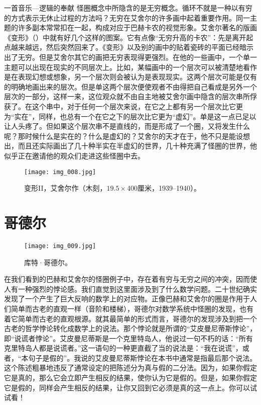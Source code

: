 \begin{intro}{一首音乐—逻辑的奉献}
怪圈概念中所隐含的是无穷概念。循环不就是一种以有穷的方式表示无休止过程的方法吗？无穷在艾舍尔的许多画中起着重要作用。同一主题的许多副本常常扣在一起，构成对应于巴赫卡农的视觉形象。艾舍尔著名的版画《变形》（）中就有好几个这样的图案。它有点像“无穷升高的卡农”：先是离开起点越来越远，然后突然回来了。《变形》以及别的画中的贴着瓷砖的平面已经暗示出了无穷。但是艾舍尔其它的画把无穷表现得更强烈。在他的一些画中，一个单一主题可以出现在现实的不同层次上。比如，某幅画中的一个层次可以被清楚地看作是在表现幻想或想象，另一个层次则会被认为是表现现实。这两个层次可能是仅有的明确地画出来的层次。但是单这两个层次便使观者不由得把自己看成是另外一个层次的一部分，这样一来，这位观众就不由自主地被艾舍尔画中隐含的层次串所俘获了。在这个串中，对于任何一个层次来说，在它之上都有另一个层次比它更为“实在”，同样，也总有一个在它之下的层次比它更为“虚幻”。单是这一点已足以让人头疼了。但如果这个层次串不是直线的，而是形成了一个圈，又将发生什么呢？那时候什么是实在的？什么是虚幻的？艾舍尔的天才在于，他不只是能设想出，而且还实际画出了几十种半实在半虚幻的世界，几十种充满了怪圈的世界，他似乎正在邀请他的观众们走进这些怪圈中去。

\begin{sidewaysfigure}
\texttt{[image: img\_008.jpg]}
\caption[变形II，艾舍尔作。]
  {变形II，艾舍尔作（木刻，$19.5\times400$厘米，1939--1940）。}
\end{sidewaysfigure}

\section{哥德尔}

\begin{figure}
\texttt{[image: img\_009.jpg]}
\caption{库特·哥德尔。}
\end{figure}

在我们看到的巴赫和艾舍尔的怪圈例子中，存在着有穷与无穷之间的冲突，因而使人有一种强烈的悖论感。我们直觉到这里面涉及到了什么数学问题。二十世纪确实发现了一个产生了巨大反响的数学上的对应物。正像巴赫和艾舍尔的圈是作用于人们简单而古老的直观一样（音阶和楼梯），哥德尔对数学系统中怪圈的发现，也有着它简单而古老的直观根源。就其最简单的形式而言，哥德尔的发现涉及到把一个古老的哲学悖论转化成数学上的说法。那个悖论就是所谓的“艾皮曼尼蒂斯悖论”，即“说谎者悖论”。艾皮曼尼蒂斯是一个克里特岛人，他说过一句不朽的话：“所有克里特岛人都是说谎者。”这一语句的一种更直截了当的说法是：“我在说谎”，或者，“本句子是假的”。我说的艾皮曼尼蒂斯悖论在本书中通常是指最后那个说法。这个陈述粗暴地违反了通常设定的把陈述分为真与假的二分法。因为，如果你假定它是真的，那么它会立即产生相反的结果，使你认为它是假的。但是，如果你假定它是假的，同样会产生相反的结果，让你又回到它必须是真的这一点上。你可以试试看！


\end{intro}
